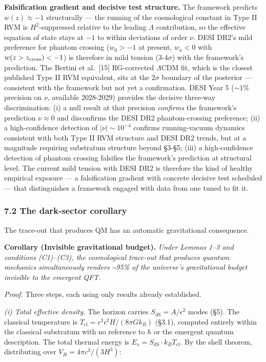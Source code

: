 \documentclass[
]{article}
\begin{document}
\textbf{Falsification gradient and decisive test structure.} The
framework predicts \(w(z) \approx -1\) structurally --- the running of
the cosmological constant in Type II RVM is \(H^2\)-suppressed relative
to the leading \(\Lambda\) contribution, so the effective equation of
state stays at \(-1\) to within deviations of order \(\nu\). DESI DR2's
mild preference for phantom crossing (\(w_0 > -1\) at present,
\(w_a < 0\) with \(w(z>z_{\rm cross}) < -1\)) is therefore in mild
tension (3-4\(\sigma\)) with the framework's prediction. The Bertini et
al.~{[}15{]} RG-corrected \(\Lambda\)CDM fit, which is the closest
published Type II RVM equivalent, sits at the \(2\sigma\) boundary of
the posterior --- consistent with the framework but not yet a
confirmation. DESI Year 5 (\(\sim 1\%\) precision on \(\nu\), available
2028-2029) provides the decisive three-way discrimination: (i) a null
result at that precision \emph{confirms} the framework's prediction
\(\nu \approx 0\) and disconfirms the DESI DR2 phantom-crossing
preference; (ii) a high-confidence detection of \(|\nu| \sim 10^{-4}\)
confirms running-vacuum dynamics consistent with both Type II RVM
structure and DESI DR2 trends, but at a magnitude requiring substratum
structure beyond §3-§5; (iii) a high-confidence detection of phantom
crossing falsifies the framework's prediction at structural level. The
current mild tension with DESI DR2 is therefore the kind of healthy
empirical exposure --- a falsification gradient with concrete decisive
test scheduled --- that distinguishes a framework engaged with data from
one tuned to fit it.

\hypertarget{the-dark-sector-corollary}{%
\subsubsection{7.2 The dark-sector
corollary}\label{the-dark-sector-corollary}}

The trace-out that produces QM has an automatic gravitational
consequence.

\textbf{Corollary (Invisible gravitational budget).} \emph{Under Lemmas
1--3 and conditions (C1)--(C3), the cosmological trace-out that produces
quantum mechanics simultaneously renders \textasciitilde95\% of the
universe's gravitational budget invisible to the emergent QFT.}

\emph{Proof.} Three steps, each using only results already established.

\emph{(i) Total effective density.} The horizon carries
\(S_{\text{dS}} = A/\epsilon^2\) modes (§5). The classical temperature
is \(T_{\text{cl}} = c^3 \epsilon^2 H / (8\pi G k_B)\) (§3.1), computed
entirely within the classical substratum with no reference to \(\hbar\)
or the emergent quantum description. The total thermal energy is
\(E_s = S_{\text{dS}} \cdot k_B T_{\text{cl}}\). By the shell theorem,
distributing over \(V_H = 4\pi c^3/(3H^3)\):
\end{document}
